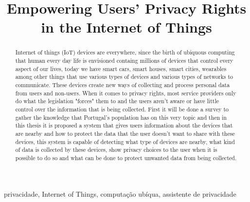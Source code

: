 \documentclass[conference]{IEEEtran}
\begin{document}
\title{Empowering Users' Privacy Rights in the Internet of Things\\
}

\author{
}

\maketitle

\begin{abstract}
Internet of things (IoT) devices are everywhere, since the birth of ubiquous
computing that human every day life is envisioned containg millions of devices
that control every aspect of our lives, today we have smart cars, smart houses,
smart cities, wearables among other things that use various types of devices
and various types of networks to communicate. These devices create new ways 
of collecting and process personal data from users and non-users.
When it comes to privacy rights, most service providers
only do what the legislation "forces" them to and the users aren't aware
or have little control over the information that is being collected. First
it will be done a survey to gather the knowledge that Portugal's population
has on this very topic and then in this thesis it is proposed a system that gives users information 
about the devices that are nearby and how
to protect the data that the user doesn't want to share with these devices,
this system is capable of detecting what type of devices are nearby,
what kind of data is collected by these devices, show privacy choices
to the user when it is possible to do so and what can be done to protect
unwanted data from being collected.
\end{abstract}

\begin{IEEEkeywords}
privacidade, Internet of Things, computação ubíqua, assistente de privacidade
\end{IEEEkeywords}
\end{document}
